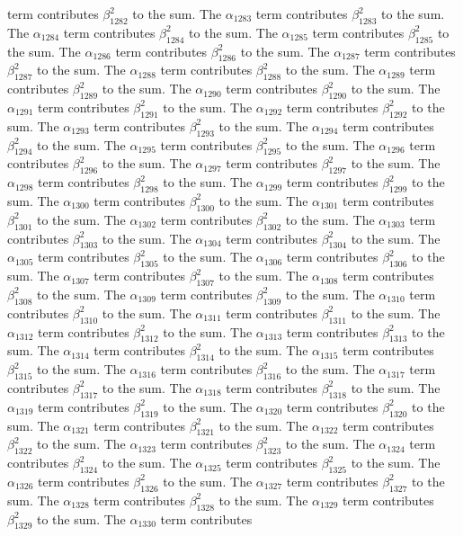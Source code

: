 \begin{lemma}
term contributes $\beta_{1282}^{2}$ to the sum. The $\alpha_{1283}$ term contributes $\beta_{1283}^{2}$ to the sum. The $\alpha_{1284}$ term contributes $\beta_{1284}^{2}$ to the sum. The $\alpha_{1285}$ term contributes $\beta_{1285}^{2}$ to the sum. The $\alpha_{1286}$ term contributes $\beta_{1286}^{2}$ to the sum. The $\alpha_{1287}$ term contributes $\beta_{1287}^{2}$ to the sum. The $\alpha_{1288}$ term contributes $\beta_{1288}^{2}$ to the sum. The $\alpha_{1289}$ term contributes $\beta_{1289}^{2}$ to the sum. The $\alpha_{1290}$ term contributes $\beta_{1290}^{2}$ to the sum. The $\alpha_{1291}$ term contributes $\beta_{1291}^{2}$ to the sum. The $\alpha_{1292}$ term contributes $\beta_{1292}^{2}$ to the sum. The $\alpha_{1293}$ term contributes $\beta_{1293}^{2}$ to the sum. The $\alpha_{1294}$ term contributes $\beta_{1294}^{2}$ to the sum. The $\alpha_{1295}$ term contributes $\beta_{1295}^{2}$ to the sum. The $\alpha_{1296}$ term contributes $\beta_{1296}^{2}$ to the sum. The $\alpha_{1297}$ term contributes $\beta_{1297}^{2}$ to the sum. The $\alpha_{1298}$ term contributes $\beta_{1298}^{2}$ to the sum. The $\alpha_{1299}$ term contributes $\beta_{1299}^{2}$ to the sum. The $\alpha_{1300}$ term contributes $\beta_{1300}^{2}$ to the sum. The $\alpha_{1301}$ term contributes $\beta_{1301}^{2}$ to the sum. The $\alpha_{1302}$ term contributes $\beta_{1302}^{2}$ to the sum. The $\alpha_{1303}$ term contributes $\beta_{1303}^{2}$ to the sum. The $\alpha_{1304}$ term contributes $\beta_{1304}^{2}$ to the sum. The $\alpha_{1305}$ term contributes $\beta_{1305}^{2}$ to the sum. The $\alpha_{1306}$ term contributes $\beta_{1306}^{2}$ to the sum. The $\alpha_{1307}$ term contributes $\beta_{1307}^{2}$ to the sum. The $\alpha_{1308}$ term contributes $\beta_{1308}^{2}$ to the sum. The $\alpha_{1309}$ term contributes $\beta_{1309}^{2}$ to the sum. The $\alpha_{1310}$ term contributes $\beta_{1310}^{2}$ to the sum. The $\alpha_{1311}$ term contributes $\beta_{1311}^{2}$ to the sum. The $\alpha_{1312}$ term contributes $\beta_{1312}^{2}$ to the sum. The $\alpha_{1313}$ term contributes $\beta_{1313}^{2}$ to the sum. The $\alpha_{1314}$ term contributes $\beta_{1314}^{2}$ to the sum. The $\alpha_{1315}$ term contributes $\beta_{1315}^{2}$ to the sum. The $\alpha_{1316}$ term contributes $\beta_{1316}^{2}$ to the sum. The $\alpha_{1317}$ term contributes $\beta_{1317}^{2}$ to the sum. The $\alpha_{1318}$ term contributes $\beta_{1318}^{2}$ to the sum. The $\alpha_{1319}$ term contributes $\beta_{1319}^{2}$ to the sum. The $\alpha_{1320}$ term contributes $\beta_{1320}^{2}$ to the sum. The $\alpha_{1321}$ term contributes $\beta_{1321}^{2}$ to the sum. The $\alpha_{1322}$ term contributes $\beta_{1322}^{2}$ to the sum. The $\alpha_{1323}$ term contributes $\beta_{1323}^{2}$ to the sum. The $\alpha_{1324}$ term contributes $\beta_{1324}^{2}$ to the sum. The $\alpha_{1325}$ term contributes $\beta_{1325}^{2}$ to the sum. The $\alpha_{1326}$ term contributes $\beta_{1326}^{2}$ to the sum. The $\alpha_{1327}$ term contributes $\beta_{1327}^{2}$ to the sum. The $\alpha_{1328}$ term contributes $\beta_{1328}^{2}$ to the sum. The $\alpha_{1329}$ term contributes $\beta_{1329}^{2}$ to the sum. The $\alpha_{1330}$ term contributes 
\end{lemma}
